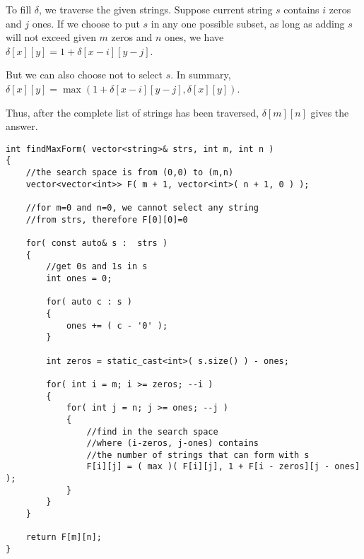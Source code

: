 To fill $\delta$, we traverse the given strings. Suppose current string $s$ contains $i$ zeros and $j$ ones. If we choose to put $s$ in any one possible subset, as long as adding $s$ will not exceed given $m$ zeros and $n$ ones, we have $\delta[x][y] = 1 + \delta[x-i][y-j]$.

But we can also choose not to select $s$. In summary, $\delta[x][y] = \max(1 + \delta[x-i][y-j], \delta[x][y])$.

Thus, after the complete list of strings has been traversed, $\delta[m][n]$ gives the answer.

\setcounter{lstlisting}{0}
\begin{lstlisting}[style=customc, caption={0-1 knapsack problem}]
int findMaxForm( vector<string>& strs, int m, int n )
{
    //the search space is from (0,0) to (m,n)
    vector<vector<int>> F( m + 1, vector<int>( n + 1, 0 ) );

    //for m=0 and n=0, we cannot select any string
    //from strs, therefore F[0][0]=0

    for( const auto& s :  strs )
    {
        //get 0s and 1s in s
        int ones = 0;

        for( auto c : s )
        {
            ones += ( c - '0' );
        }

        int zeros = static_cast<int>( s.size() ) - ones;

        for( int i = m; i >= zeros; --i )
        {
            for( int j = n; j >= ones; --j )
            {
                //find in the search space
                //where (i-zeros, j-ones) contains
                //the number of strings that can form with s
                F[i][j] = ( max )( F[i][j], 1 + F[i - zeros][j - ones] );
            }
        }
    }

    return F[m][n];
}
\end{lstlisting}